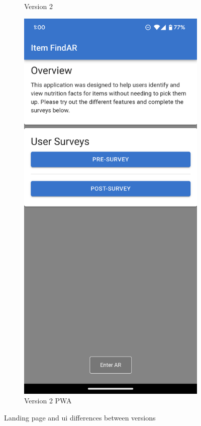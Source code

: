 \documentclass[thesis]{fputhesis}
\begin{document}
\begin{body}
\begin{figure}[h]
\begin{subfigure}[]{0.3\textwidth}
        \caption{Version 2}
        \label{fig:v2}
    \end{subfigure}
    \begin{subfigure}[]{0.3\textwidth}
        \includegraphics[width=\textwidth]{Images/pwav2.png}
        \caption{Version 2 PWA}
        \label{fig:v2-pwa}
    \end{subfigure}
    \caption{Landing page and \acrshort{ui} differences between versions}
    \label{fig:landing-pages}
\end{figure}
\filbreak

\end{body}
\end{document}
